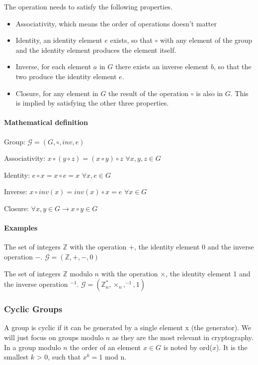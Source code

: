 \documentclass[a4paper,12pt]{scrartcl}
\begin{document}
The operation needs to satisfy the following properties.
\begin{itemize}
	\item Associativity, which means the order of operations doesn't matter
	\item Identity, an identity element $e$ exists, so that $\circ$ with any element of the group and the identity element produces the element itself.
	\item Inverse, for each element $a$ in $G$ there exists an inverse element $b$, so that the two produce the identity element $e$.
	\item Closure, for any element in $G$ the result of the operation $\circ$ is also in $G$. This is implied by satisfying the other three properties.
\end{itemize}

\paragraph{Mathematical definition}\hfill

Group: $\mathcal{G} = (G, \circ, inv, e)$

Associativity: $ x \circ (y \circ z) = (x \circ y) \circ z$ $\forall x,y,z \in G $

Identity: $ e \circ x = x \circ e = x $ $ \forall x,e  \in G $

Inverse: $ x \circ inv(x) = inv(x) \circ x = e $ $ \forall x \in G $

Closure: $ \forall x,y \in G \rightarrow x \circ y \in G $

\paragraph{Examples}\hfill

The set of integers $\mathbb{Z}$ with the operation $+$, the identity element 0 and the inverse operation $-$. $\mathcal{G} = (\mathbb{Z},+,-,0)$

The set of integers $\mathbb{Z}$ modulo $n$ with the operation $\times$, the identity element 1 and the inverse operation $^{-1}$. $\mathcal{G} = (\mathbb{Z}_{n}^*, \times_{n}, ^{-1}, 1)$

\subsubsection{Cyclic Groups}

A group is cyclic if it can be generated by a single element x (the generator). We will just focus on groups modulo $n$ as they are the most relevant in cryptography. In a group modulo $n$ the order of an element $x\in G$ is noted by ord($x$). It is the smallest $k$ > 0, such that $x^k = 1$ mod n.
\end{document}
